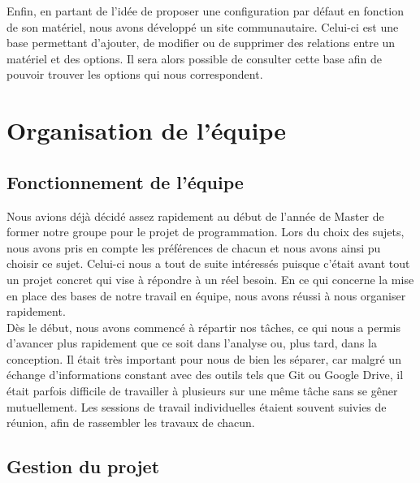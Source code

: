 \documentclass[16pts]{report}
\begin{document}
Enfin, en partant de l'idée de proposer une configuration par défaut en 
fonction de son matériel, nous avons développé un site communautaire. 
Celui-ci est une base permettant d'ajouter, de modifier ou de supprimer 
des relations entre un matériel et des options. Il sera alors possible de 
consulter cette base afin de pouvoir trouver les options qui nous 
correspondent.
\\

\chapter{Organisation de l'équipe}
\label{cha:Organisation de l'équipe}
    \section{Fonctionnement de l'équipe}
    \label{sec:Fonctionnement de l'équipe}

Nous avions déjà décidé assez rapidement au début de l'année de Master 
de former notre groupe pour le projet de programmation. Lors du choix 
des sujets, nous avons pris en compte les préférences de chacun et nous 
avons ainsi pu choisir ce sujet. Celui-ci nous a tout de suite intéressés 
puisque c'était avant tout un projet concret qui vise à répondre à un 
réel besoin.
En ce qui concerne la mise en place des bases de notre travail en 
équipe, nous avons réussi à nous organiser rapidement. 
\\

Dès le début, nous avons commencé à répartir nos tâches, ce qui nous a 
permis d’avancer plus rapidement que ce soit dans l’analyse ou, plus tard, 
dans la conception. Il était très important pour nous de bien les séparer, 
car malgré un échange d’informations constant avec des outils tels que 
Git ou Google Drive, il était parfois difficile de travailler à plusieurs 
sur une même tâche sans se gêner mutuellement. Les sessions de travail 
individuelles étaient souvent suivies de réunion, afin de rassembler 
les travaux de chacun.
\\


    \section{Gestion du projet}
    \label{sec:Gestion du projet}
\end{document}
